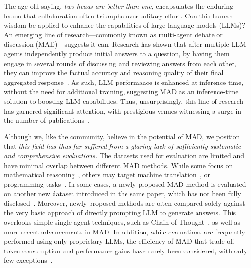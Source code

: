 
The age-old saying, \emph{two heads are better than one}, encapsulates the enduring lesson that collaboration often triumphs over solitary effort.
Can this human wisdom be applied to enhance the capabilities of large language models (LLMs)?
An emerging line of research---commonly known as multi-agent debate or discussion (MAD)---suggests it can. 
Research has shown that after multiple LLM agents independently produce initial answers to a question, by having them engage in several rounds of discussing and reviewing answers from each other, they can improve the factual accuracy and reasoning quality of their final aggregated response~\citep{duimproving}. As such, LLM performance is enhanced at inference time, without the need for additional training, suggesting MAD as an inference-time solution to boosting LLM capabilities.
Thus, unsurprisingly, this line of research has garnered significant attention, with prestigious venues witnessing a surge in the number of publications~\citep{ yin2023exchange, liang2023encouraging, chen2023agentverse, chanchateval, wang2024rethinking, smit2023we}.



Although we, like the community, believe in the potential of MAD, we position that \emph{this field has thus far suffered from a glaring lack of sufficiently systematic and comprehensive evaluations.}
The datasets used for evaluation are limited and have minimal overlap between different MAD methods. 
While some focus on mathematical reasoning~\citep{duimproving, yin2023exchange}, others may target machine translation~\citep{liang2023encouraging}, 
or programming tasks~\citep{chen2023agentverse}.
In some cases, a newly proposed MAD method is evaluated on another new dataset introduced in the same paper, which has not been fully disclosed~\citep{chanchateval}.
Moreover, newly proposed methods are often compared solely against the very basic approach of directly prompting LLM to generate answers. This overlooks simple single-agent techniques, such as Chain-of-Thought~\citep{cot}, as well as more recent advancements in MAD.
In addition, while evaluations are frequently performed using only proprietary LLMs, the efficiency of MAD that trade-off token consumption and performance gains have rarely been considered, with only few exceptions~\citep{smit2023we}.

